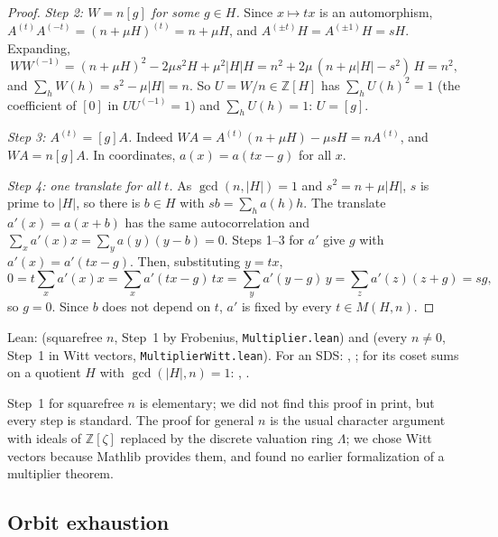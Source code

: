 \begin{proof}
\emph{Step 2: $W = n[g]$ for some $g \in H$.} Since $x \mapsto tx$ is an automorphism,
$A^{(t)}A^{(-t)} = (n + \mu H)^{(t)} = n + \mu H$, and $A^{(\pm t)}H = A^{(\pm 1)} H = sH$.
Expanding,
\[
  W W^{(-1)} = (n + \mu H)^2 - 2\mu s^2 H + \mu^2|H|H
  = n^2 + 2\mu\,(n + \mu|H| - s^2)\,H = n^2 ,
\]
and $\sum_h W(h) = s^2 - \mu|H| = n$. So $U = W/n \in \mathbb{Z}[H]$ has $\sum_h U(h)^2 = 1$
(the coefficient of $[0]$ in $UU^{(-1)} = 1$) and $\sum_h U(h) = 1$: $U = [g]$.

\emph{Step 3: $A^{(t)} = [g]A$.} Indeed $WA = A^{(t)}(n + \mu H) - \mu sH = nA^{(t)}$, and
$WA = n[g]A$. In coordinates, $a(x) = a(tx - g)$ for all $x$.

\emph{Step 4: one translate for all $t$.} As $\gcd(n, |H|) = 1$ and $s^2 = n + \mu|H|$, $s$ is
prime to $|H|$, so there is $b \in H$ with $sb = \sum_h a(h)h$. The translate
$a'(x) = a(x + b)$ has the same autocorrelation and $\sum_x a'(x)x = \sum_y a(y)(y - b) = 0$.
Steps 1--3 for $a'$ give $g$ with $a'(x) = a'(tx - g)$. Then, substituting $y = tx$,
\[
  0 = t\sum_x a'(x)x = \sum_x a'(tx - g)\,tx = \sum_y a'(y - g)\,y = \sum_z a'(z)(z + g) = sg,
\]
so $g = 0$. Since $b$ does not depend on $t$, $a'$ is fixed by every $t \in M(H, n)$.
\end{proof}

\noindent Lean:  (squarefree $n$, Step~1 by
Frobenius, \texttt{Multiplier.lean}) and  (every
$n \neq 0$, Step~1 in Witt vectors, \texttt{MultiplierWitt.lean}). For an SDS:
, ; for its coset sums
on a quotient $H$ with $\gcd(|H|, n) = 1$: ,
.

\begin{remark}
Step~1 for squarefree $n$ is elementary; we did not find this proof in print, but every step is
standard. The proof for general $n$ is the usual character argument with ideals of
$\mathbb{Z}[\zeta]$ replaced by the discrete valuation ring $\Lambda$; we chose Witt vectors
because Mathlib provides them, and found no earlier formalization of a multiplier theorem.
\end{remark}

\subsection{Orbit exhaustion}

